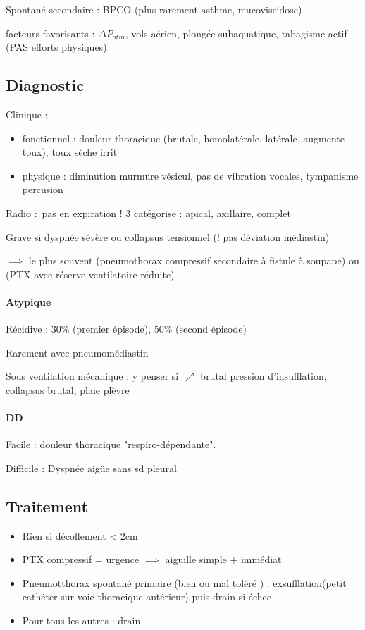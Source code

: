 Spontané secondaire : BPCO (plus rarement asthme, mucoviscidose)

facteurs favorisants : $\Delta P_{atm}$, vols aérien, plongée subaquatique,
tabagisme actif (PAS
efforts physiques)

\subsection{Diagnostic}
Clinique : 
\begin{itemize}
\item fonctionnel : douleur thoracique (brutale, homolatérale, latérale,
  augmente toux), toux sèche irrit
\item physique : diminution murmure vésicul, pas de vibration vocales,
  tympanisme percusion
\end{itemize}
Radio : pas en expiration ! 3 catégorise : apical, axillaire, complet

Grave si dyspnée sévère ou collapsus tensionnel (! pas déviation médiastin) 

$\implies$ le plus souvent (pneumothorax compressif secondaire à fistule à
soupape) ou (PTX avec réserve ventilatoire réduite)

\paragraph{Atypique}
Récidive : 30\% (premier épisode), 50\% (second épisode)

Rarement avec pneumomédiastin

Sous ventilation mécanique : y penser si $\nearrow$ brutal pression
d'insufflation, collapsus brutal, plaie plèvre

\paragraph{DD}
Facile : douleur thoracique "respiro-dépendante".

Difficile : Dyspnée aigüe sans sd pleural 

\subsection{Traitement}
\begin{itemize}
\item Rien si décollement < 2cm
\item PTX compressif = urgence $\implies$ aiguille simple + immédiat
\item Pneumotthorax spontané primaire (bien ou mal toléré ) :
  exsufflation(petit cathéter sur voie thoracique antérieur) puis drain
  si échec
\item Pour tous les autres : drain
\end{itemize}

